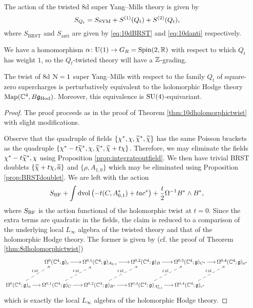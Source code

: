 \documentclass[10pt, oneside]{article}
\begin{document}
The action of the twisted 8d super Yang--Mills theory is given by
\[S_{Q_t} = S_{\rm SYM} + S^{(1)}(Q_t) + S^{(2)}(Q_t),\]
where $S_{\mathrm{BRST}}$ and $S_{\mathrm{anti}}$ are given by \eqref{eq:10dBRST} and \eqref{eq:10danti} respectively.

We have a homomorphism $\alpha\colon \mathrm{U}(1)\rightarrow G_R=\mathrm{Spin}(2, \mathbb R)$ with respect to which $Q_t$ has weight $1$, so the $Q_t$-twisted theory will have a $\mathbb Z$-grading.

\begin{theorem}
The twist of 8d $\mathcal N=1$ super Yang--Mills with respect to the family $Q_t$ of square-zero supercharges is perturbatively equivalent to the holomorphic Hodge theory $\operatorname{Map}(\mathbb C^4, B\mathfrak g_{\mathrm{Hod}})$. Moreover, this equivalence is $\mathrm{SU}(4)$-equivariant.
\label{thm:8dHodgetwist}
\end{theorem}
\begin{proof}
The proof proceeds as in the proof of Theorem \ref{thm:10dholomorphictwist} with slight modifications.

Observe that the quadruple of fields $\{\chi^*, \chi, \widetilde{\chi}^*, \widetilde{\chi}\}$ has the same Poisson brackets as the quadruple $\{\chi^*-t\widetilde{\chi}^*, \chi, \widetilde{\chi}^*, \widetilde{\chi} + t\chi\}$. Therefore, we may eliminate the fields $\chi^*-t\widetilde{\chi}^*, \chi$ using Proposition \ref{prop:integrateoutfield}. We then have trivial BRST doublets $\{\widetilde{\chi} + t\chi, \widetilde{a}\}$ and $\{\rho, A_{1, 0}\}$ which may be eliminated using Proposition \ref{prop:BRSTdoublet}. We are left with the action
\[S_{\mathrm{BF}} + \int\operatorname{dvol}\left(-t(C, A_{0, 1}^*) + ta c^*\right) + \frac{t}{2} \Omega^{-1} B^*\wedge B^*,\]
where $S_{\mathrm{BF}}$ is the action functional of the holomorphic twist at $t=0$. Since the extra terms are quadratic in the fields, the claim is reduced to a comparison of the underlying local $L_\infty$ algebra of the twisted theory and that of the holomorphic Hodge theory. The former is given by (cf. the proof of Theorem \ref{thm:8dholomorphictwist})
\[
\xymatrix@C=0.5cm{
&\Omega^0(\CC^4; \gg)_c \ar[r] &\Omega^{0,1}(\CC^4; \gg)_{A_{0,1}} \ar[r] &\Omega^{0,2}(\CC^4; \gg)_{B} \ar[r] &\Omega^{0,3}(\CC^4; \gg)_{C^*} \ar[r] &\Omega^{0,4}(\CC^4; \gg)_{a^*} \\
\Omega^0(\CC^4; \gg)_a \ar[r] \ar@{-->}^{t\id}[ur] & \Omega^{0,1}(\CC^4; \gg)_C \ar[r] \ar@{-->}^{t\id}[ur] &\Omega^{0,2}(\CC^4; \gg)_{B^*} \ar[r] \ar@{-->}^{t\id}[ur] &\Omega^{0,3}(\CC^4; \gg)_{A_{0,1}^*} \ar[r] \ar@{-->}^{t\id}[ur] &\Omega^{0,4}(\CC^4; \gg)_{c^*} \ar@{-->}^{t\id}[ur] &
}
\]
which is exactly the local $L_\infty$ algebra of the holomorphic Hodge theory.
\end{proof}
\end{document}
